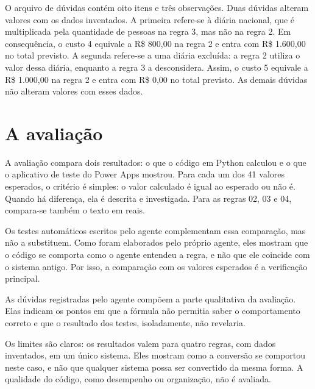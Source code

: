 O arquivo de dúvidas contém oito itens e três observações. Duas dúvidas alteram valores com os dados inventados. A primeira refere-se à diária nacional, que é multiplicada pela quantidade de pessoas na regra 3, mas não na regra 2. Em consequência, o custo 4 equivale a R\$ 800,00 na regra 2 e entra com R\$ 1.600,00 no total previsto. A segunda refere-se a uma diária excluída: a regra 2 utiliza o valor dessa diária, enquanto a regra 3 a desconsidera. Assim, o custo 5 equivale a R\$ 1.000,00 na regra 2 e entra com R\$ 0,00 no total previsto. As demais dúvidas não alteram valores com esses dados.

\section{A avaliação}
\label{sec:avaliacao}

A avaliação compara dois resultados: o que o código em Python calculou e o que o aplicativo de teste do Power Apps mostrou. Para cada um dos 41 valores esperados, o critério é simples: o valor calculado é igual ao esperado ou não é. Quando há diferença, ela é descrita e investigada. Para as regras 02, 03 e 04, compara-se também o texto em reais.

Os testes automáticos escritos pelo agente complementam essa comparação, mas não a substituem. Como foram elaborados pelo próprio agente, eles mostram que o código se comporta como o agente entendeu a regra, e não que ele coincide com o sistema antigo. Por isso, a comparação com os valores esperados é a verificação principal.

As dúvidas registradas pelo agente compõem a parte qualitativa da avaliação. Elas indicam os pontos em que a fórmula não permitia saber o comportamento correto e que o resultado dos testes, isoladamente, não revelaria.

Os limites são claros: os resultados valem para quatro regras, com dados inventados, em um único sistema. Eles mostram como a conversão se comportou neste caso, e não que qualquer sistema possa ser convertido da mesma forma. A qualidade do código, como desempenho ou organização, não é avaliada.
